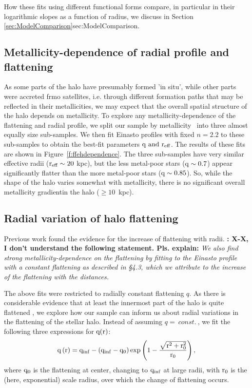 \documentclass[12pt,preprint]{aastex}
\begin{document}
How these fits using different functional forms compare, in particular in their logarithmic slopes as a function of radius, we discuss in
Section \ref{sec:ModelComparison}{sec:ModelComparison}.


\subsection{Metallicity-dependence of radial profile and flattening}\label{sec:Results_Flattening}

As some parts of the halo have presumably formed 'in situ', while other parts were accreted frmo satellites, i.e. through different formation paths that may be reflected in their metallicities, 
 we may expect that the overall spatial structure of the halo depends on metallicity.
To explore any metallicity-dependence of the flattening and radial profile, we split our sample
by metallicity \ into three almost equally size sub-samples. We then fit Einasto profiles with fixed $n=2.2$ to these sub-samples to obtain the best-fit parameters $\rm q ~and ~r_{eff}$. The results of these fits are shown in Figure~\ref{f:ffehdependence}. The three sub-samples have very similar effective radii ($\rm r_{eff}\sim20~$kpc), but the less metal-poor stars ($\rm q\sim0.7$) appear
significantly flatter than the more metal-poor stars ($\rm q\sim0.85$).
So, while the shape of the halo varies somewhat with metallicity, there is no significant overall metallicity gradientin the halo ($\ge 10$~kpc). 

\subsection{Radial variation of halo flattening}\label{sec:Results_FlatteningVariations}
Previous work found the evidence for the increase of flattening with radii\citep{Preston1991}.
{\bf: X-X, I don't understand the following statement. Pls. explain:}\textit{ We also find strong metallicity-dependence on the flattening by fitting to the Einasto profile with a constant flattening as described in \S 4.3, which we attribute to the increase of the flattening with the distances.}

The above fits were restricted to radially constant flattening $q$. As there is considerable evidence that at least the innermost part of the halo is quite flattened \citep{Carollo2010}, we explore how our sample can inform us about radial variations in the flattening of the stellar halo.  Instead of assuming $q=~const.~$, we fit the following three expressions for $\rm q(r)$:
\begin{equation}
\rm q\left(r\right)=q_{inf}-\left(q_{inf}-q_0\right)exp\left(1-\frac{\sqrt{r^2+r_0^2}}{r_0}\right),
\end{equation}
where  $\rm q_0$ is the flattening at center, changing to $\rm q_{inf}$ at large radii, with $\rm r_0$ is the (here, exponential) scale radius, over which the change of flattening occurs. 
\end{document}
